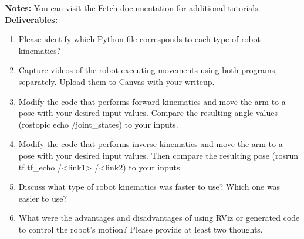 \documentclass[12pt]{article}
\begin{document}
\textbf{Notes:}
You can visit the Fetch documentation for \href{https://docs.fetchrobotics.com/manipulation.html#running-the-pick-and-place-demo}{additional tutorials}. \\

\textbf{Deliverables:}
\begin{enumerate}
    \item Please identify which Python file corresponds to each type of robot kinematics?
    
    \item Capture videos of the robot executing movements using both programs, separately. Upload them to Canvas with your writeup. 
    
    \item Modify the code that performs forward kinematics and move the arm to a pose with your desired input values. Compare the resulting angle values (rostopic echo /joint\_states) to your inputs.

    \item Modify the code that performs inverse kinematics and move the arm to a pose with your desired input values. Then compare the resulting pose (rosrun tf tf\_echo /<link1> /<link2) to your inputs.
    
    \item Discuss what type of robot kinematics was faster to use? Which one was easier to use?
    
    \item What were the advantages and disadvantages of using RViz or generated code to control the robot's motion? Please provide at least two thoughts.
\end{enumerate}
\end{document}
